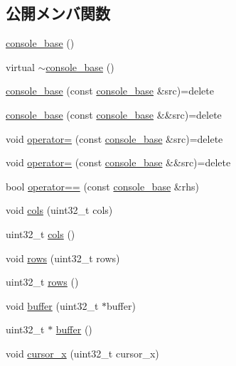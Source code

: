 \subsection*{公開メンバ関数}
\begin{DoxyCompactItemize}
\item 
\hyperlink{classconsole__base_ab72690282352009b2eca56c12d0e6529}{console\+\_\+base} ()
\item 
virtual \hyperlink{classconsole__base_a956275f5f7c00148939cfe5bab999b7a}{$\sim$console\+\_\+base} ()
\item 
\hyperlink{classconsole__base_a103e9d972e533b0f09d50dac22edf09f}{console\+\_\+base} (const \hyperlink{classconsole__base}{console\+\_\+base} \&src)=delete
\item 
\hyperlink{classconsole__base_a9f82b2ea08cdbb111e0970eadbe8d7bf}{console\+\_\+base} (const \hyperlink{classconsole__base}{console\+\_\+base} \&\&src)=delete
\item 
void \hyperlink{classconsole__base_aca6f22d7287a8c9f0463b6b9d2a746a4}{operator=} (const \hyperlink{classconsole__base}{console\+\_\+base} \&src)=delete
\item 
void \hyperlink{classconsole__base_ae641c39b964cabdde834f67cd77b556a}{operator=} (const \hyperlink{classconsole__base}{console\+\_\+base} \&\&src)=delete
\item 
bool \hyperlink{classconsole__base_a28633feb8f1724680c255166ee9b2e1a}{operator==} (const \hyperlink{classconsole__base}{console\+\_\+base} \&rhs)
\item 
void \hyperlink{classconsole__base_a625c2d1eede5ce568765ba84b2e30c6a}{cols} (uint32\+\_\+t cols)
\item 
uint32\+\_\+t \hyperlink{classconsole__base_a9e9ea675def1c8df2defea7fb7d2c982}{cols} ()
\item 
void \hyperlink{classconsole__base_aefdc51ef2ad888e5de55429e59ddb9a3}{rows} (uint32\+\_\+t rows)
\item 
uint32\+\_\+t \hyperlink{classconsole__base_a6124ee0455ba292763d23cb137dc9929}{rows} ()
\item 
void \hyperlink{classconsole__base_a98b7835fa6b24b8d8e54f5531406a305}{buffer} (uint32\+\_\+t $\ast$buffer)
\item 
uint32\+\_\+t $\ast$ \hyperlink{classconsole__base_a9bdd8fb03a4380e2793fa35298bb3fc4}{buffer} ()
\item 
void \hyperlink{classconsole__base_a9dce56c685c21f12ca54bb73e5dffcb4}{cursor\+\_\+x} (uint32\+\_\+t cursor\+\_\+x)
\item 

\end{DoxyCompactItemize}
